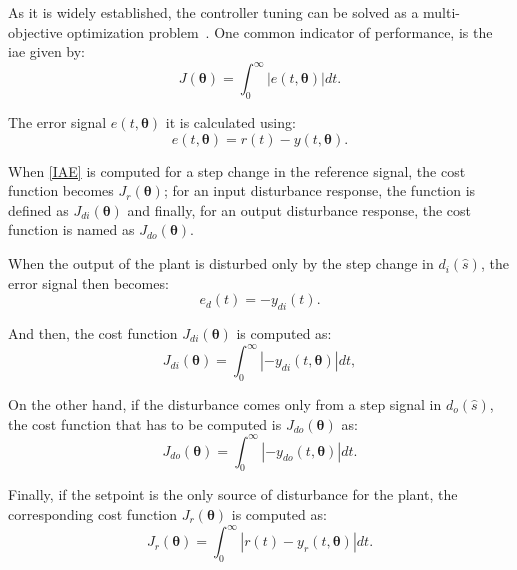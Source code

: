 As it is widely established, the controller tuning can be solved as a multi-objective optimization problem~\citep{Gambier2007}. One common indicator of performance, is the \gls{iae} given by:
%
\begin{equation}  %
J(\bm{\theta})=\int_0^\infty \left |{e(t,\bm{\theta})}\right | dt.
\label{IAE}
\end{equation}

The error signal $e(t, \bm{\theta})$ it is calculated using:
%
\begin{equation}  %
e(t,\bm{\theta})=r(t)-y(t,\bm{\theta}).
\label{error}
\end{equation}

When \eqref{IAE} is computed for a step change in the reference signal, the cost function becomes $J_r(\bm{\theta})$; for an input disturbance response, the function is defined as $J_{di}(\bm{\theta})$ and finally, for an output disturbance response, the cost function is named as $J_{do}(\bm{\theta})$.

When the output of the plant is disturbed only by the step change in $d_i(\hat{s})$, the error signal then becomes:
\begin{equation}  %
e_d(t)=-y_{di}(t)
\label{per}.
\end{equation}

And then, the cost function $J_{di}(\bm{\theta})$ is computed as:
\begin{equation}  %
J_{di}(\bm{\theta})= \int_0^\infty  \left |-{y_{di}(t,\bm{\theta})}\right | dt,
\label{perin}
\end{equation}

On the other hand, if the disturbance comes only from a step signal in $d_o(\hat{s})$, the cost function that has to be computed is $J_{do}(\bm{\theta})$ as:
%
\begin{equation}  %
J_{do}(\bm{\theta})= \int_0^\infty  \left |-{y_{do}(t,\bm{\theta})}\right | dt.
\label{perout}
\end{equation}	
%

Finally, if the setpoint is the only source of disturbance for the plant, the corresponding cost function $J_r(\bm{\theta})$ is computed as:
\begin{equation}  %
J_r(\bm{\theta})=\int_0^\infty \left |r(t)-y_r(t,\bm{\theta})\right | dt.
\label{eq:Jr}
\end{equation}
%

